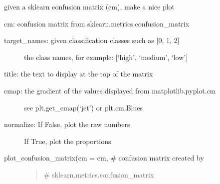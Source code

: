 \documentclass[letterpaper,10pt,english,openany,oneside]{sphinxmanual}
\begin{document}
\begin{fulllineitems}
\begin{fulllineitems}
\end{fulllineitems}


\begin{fulllineitems}
\label{\detokenize{Evaluation:cmc.Evaluation.Evaluation.plot_confusion_matrix}}
given a sklearn confusion matrix (cm), make a nice plot

cm:           confusion matrix from sklearn.metrics.confusion\_matrix
\begin{description}
\item[{target\_names: given classification classes such as {[}0, 1, 2{]}}] \leavevmode
the class names, for example: {[}‘high’, ‘medium’, ‘low’{]}

\end{description}

title:        the text to display at the top of the matrix
\begin{description}
\item[{cmap:         the gradient of the values displayed from matplotlib.pyplot.cm}] \leavevmode
see 
plt.get\_cmap(‘jet’) or plt.cm.Blues

\item[{normalize:    If False, plot the raw numbers}] \leavevmode
If True, plot the proportions

\end{description}
\begin{description}
\item[{plot\_confusion\_matrix(cm           = cm,                  \# confusion matrix created by}] \leavevmode\begin{quote}

\# sklearn.metrics.confusion\_matrix
\end{quote}


\end{description}
\end{fulllineitems}
\end{fulllineitems}
\end{document}
